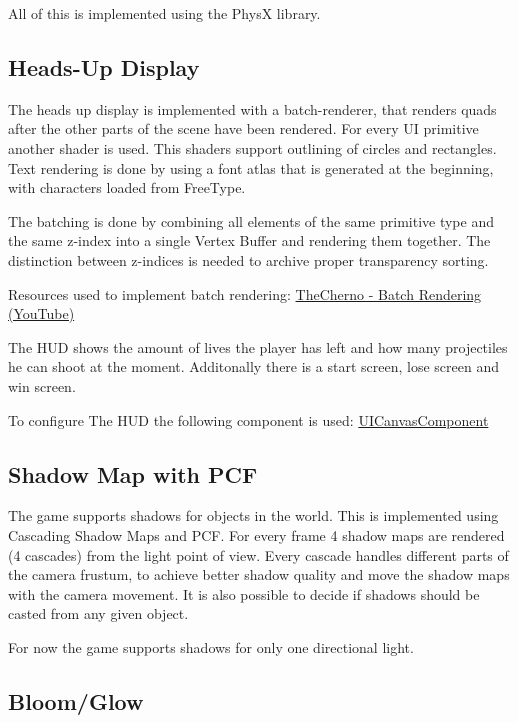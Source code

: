 \documentclass{article}
\begin{document}
    All of this is implemented using the PhysX library.

    \subsection{Heads-Up Display}

    The heads up display is implemented with a batch-renderer, that renders quads after the other parts of the scene have been rendered. For every UI primitive another shader is used. This shaders support outlining of circles and rectangles. Text rendering is done by using a font atlas that is generated at the beginning, with characters loaded from FreeType.

    The batching is done by combining all elements of the same primitive type and the same z-index into a single Vertex Buffer and rendering them together. The distinction between z-indices is needed to archive proper transparency sorting.

    Resources used to implement batch rendering: \href{https://www.youtube.com/watch?v=Th4huqR77rI&list=PLlrATfBNZ98f5vZ8nJ6UengEkZUMC4fy5}{TheCherno - Batch Rendering (YouTube)}

    The HUD shows the amount of lives the player has left and how many projectiles he can shoot at the moment. Additonally there is a start screen, lose screen and win screen.

    To configure The HUD the following component is used: \href{https://github.com/Liioooo/cgue23-pac3D/blob/master/docs/md/COMPONENTS_DOCS.md#uicanvascomponent}{UICanvasComponent}

    \subsection{Shadow Map with PCF}

    The game supports shadows for objects in the world. This is implemented using Cascading Shadow Maps and PCF. For every frame 4 shadow maps are rendered (4 cascades) from the light point of view. Every cascade handles different parts of the camera frustum, to achieve better shadow quality and move the shadow maps with the camera movement. It is also possible to decide if shadows should be casted from any given object.

    For now the game supports shadows for only one directional light.

    \subsection{Bloom/Glow}
\end{document}
